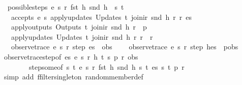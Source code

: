\begin{isabellebody}
\ \ {\isachardoublequoteopen}possible{\isacharunderscore}steps\ e\ s\ r\ {\isacharparenleft}fst\ h{\isacharparenright}\ {\isacharparenleft}snd\ h{\isacharparenright}\ {\isacharequal}\ {\isacharbraceleft}{\isacharbar}{\isacharparenleft}s{\isacharprime}{\isacharcomma}\ t{\isacharparenright}{\isacharbar}{\isacharbraceright}\ {\isasymLongrightarrow}\isanewline
\ \ \ accepts\ e\ s{\isacharprime}\ {\isacharparenleft}apply{\isacharunderscore}updates\ {\isacharparenleft}Updates\ t{\isacharparenright}\ {\isacharparenleft}join{\isacharunderscore}ir\ {\isacharparenleft}snd\ h{\isacharparenright}\ r{\isacharparenright}\ r{\isacharparenright}\ es\ {\isasymLongrightarrow}\isanewline
\ \ \ apply{\isacharunderscore}outputs\ {\isacharparenleft}Outputs\ t{\isacharparenright}\ {\isacharparenleft}join{\isacharunderscore}ir\ {\isacharparenleft}snd\ h{\isacharparenright}\ r{\isacharparenright}\ {\isacharequal}\ p\ {\isasymLongrightarrow}\isanewline
\ \ \ apply{\isacharunderscore}updates\ {\isacharparenleft}Updates\ t{\isacharparenright}\ {\isacharparenleft}join{\isacharunderscore}ir\ {\isacharparenleft}snd\ h{\isacharparenright}\ r{\isacharparenright}\ r\ {\isacharequal}\ r{\isacharprime}\ {\isasymLongrightarrow}\isanewline
\ \ \ observe{\isacharunderscore}trace\ e\ s{\isacharprime}\ r{\isacharprime}\ step\ es\ {\isacharequal}\ obs\ {\isasymLongrightarrow}\isanewline
\ \ \ observe{\isacharunderscore}trace\ e\ s\ r\ step\ {\isacharparenleft}h{\isacharhash}es{\isacharparenright}\ {\isacharequal}\ p{\isacharhash}obs{\isachardoublequoteclose}\isanewline
%
\isadelimproof
\ \ %
\endisadelimproof
%
\isatagproof
{}\isamarkupfalse%
\ observe{\isacharunderscore}trace{\isacharunderscore}step{\isacharbrackleft}of\ es\ e\ s\ r\ h\ t\ s{\isacharprime}\ p\ r{\isacharprime}\ obs{\isacharbrackright}\isanewline
\ \ \ \ \ \ \ \ step{\isacharunderscore}some{\isacharbrackleft}of\ {\isachardoublequoteopen}{\isacharbraceleft}{\isacharbar}{\isacharparenleft}s{\isacharprime}{\isacharcomma}\ t{\isacharparenright}{\isacharbar}{\isacharbraceright}{\isachardoublequoteclose}\ e\ s\ r\ {\isachardoublequoteopen}fst\ h{\isachardoublequoteclose}\ {\isachardoublequoteopen}snd\ h{\isachardoublequoteclose}\ {\isachardoublequoteopen}{\isacharbraceleft}{\isacharbar}{\isacharparenleft}s{\isacharprime}{\isacharcomma}\ t{\isacharparenright}{\isacharbar}{\isacharbraceright}{\isachardoublequoteclose}\ es\ s{\isacharprime}\ t\ p\ r{\isacharprime}{\isacharbrackright}\isanewline
\ \ \isamarkupfalse%
\ {\isacharparenleft}simp\ add{\isacharcolon}\ ffilter{\isacharunderscore}singleton\ random{\isacharunderscore}member{\isacharunderscore}def{\isacharparenright}%

\end{isabellebody}
